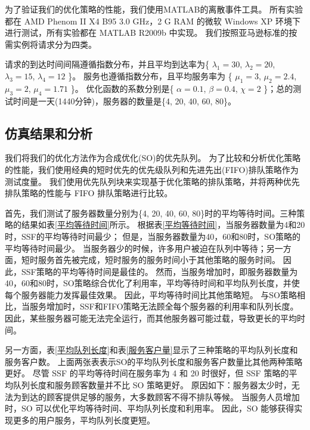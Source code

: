 \documentclass{morningstar}
\begin{document}
为了验证我们的优化策略的性能，我们使用MATLAB的离散事件工具。
所有实验都在 AMD Phenom II X4 B95 3.0 GHz，2 G RAM 的微软 Windows XP 环境下进行测试，所有实验都在 MATLAB R2009b 中实现。
我们按照亚马逊标准的按需实例将请求分为四类。

请求的到达时间间隔遵循指数分布，并且平均到达率为\{ $\lambda_1 = 30$, $\lambda_2 = 20$, $\lambda_3 = 15$, $\lambda_4 = 12$ \}。
服务也遵循指数分布，且平均服务率为 \{ $\mu_1=3$, $\mu_2=2.4$, $\mu_3=2$, $\mu_4=1.71$ \}。
优化函数的系数分别是\{ $\alpha = 0.1$, $\beta = 0.4$, $\chi = 2$ \}；总的测试时间是一天(1440分钟)，服务器的数量是\{4, 20, 40, 60, 80\}。

\subsection{仿真结果和分析}

我们将我们的优化方法作为合成优化(SO)的优先队列。
为了比较和分析优化策略的性能，我们使用经典的短时优先的优先级队列和先进先出(FIFO)排队策略作为测试度量。
我们使用优先队列块来实现基于优化策略的排队策略，并将两种优先排队策略的性能与 FIFO 排队策略进行比较。
\par





首先，我们测试了服务器数量分别为\{4, 20, 40, 60, 80\}时的平均等待时间。三种策略的结果如表\ref{平均等待时间}所示。
根据表\ref{平均等待时间}，当服务器数量为4和20时，SSF的平均等待时间最少；
但是，当服务器数量为40，60和80时，SO策略的平均等待时间最少。
当服务器少的时候，许多用户被迫在队列中等待；另一方面，短时服务首先被完成，短时服务的服务时间小于其他策略的服务时间。
因此，SSF策略的平均等待时间是最佳的。
然而，当服务增加时，即服务器数量为40，60和80时，SO策略综合优化了利用率，平均等待时间和平均队列长度，并使每个服务器能力发挥最佳效果。
因此，平均等待时间比其他策略短。
与SO策略相比，当服务增加时，SSF和FIFO策略无法顾全每个服务器的利用率和队列长度。
因此，某些服务器可能无法完全运行，而其他服务器可能过载，导致更长的平均时间。
\par

另一方面，表\ref{平均队列长度}和表\ref{服务客户量}显示了三种策略的平均队列长度和服务客户数。
上面两张表表示SO的平均队列长度和服务客户数量比其他两种策略更好。
尽管 SSF 的平均等待时间在服务率为 4 和 20 时很好，但 SSF 策略的平均队列长度和服务顾客数量并不比 SO 策略更好。
原因如下：服务器太少时，无法为到达的顾客提供足够的服务，大多数顾客不得不排队等候。
当服务人员增加时，SO 可以优化平均等待时间、平均队列长度和利用率。
因此，SO 能够获得实现更多的用户服务，平均队列长度更短。
\par
\end{document}
